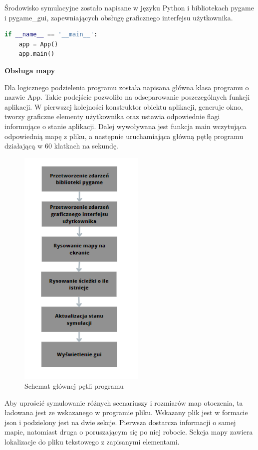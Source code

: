 Środowisko symulacyjne zostało napisane w języku Python i bibliotekach pygame\cite{dokPygame} i pygame\_gui\cite{dokPygameGui},
zapewniających obsługę graficznego interfejsu użytkownika. 
\begin{lstlisting}[language=Python,caption=Uruchomienie aplikacji,label={kodPythonStartApki}]
if __name__ == '__main__':
    app = App()
    app.main()
\end{lstlisting}

\textbf{Obsługa mapy}

Dla logicznego podzielenia programu została napisana główna klasa programu o nazwie App.
Takie podejście pozwoliło na odseparowanie poszczególnych funkcji aplikacji. 
W pierwszej kolejności konstruktor obiektu aplikacji, generuje okno, tworzy 
graficzne elementy użytkownika oraz ustawia odpowiednie flagi informujące o stanie aplikacji. 
Dalej wywoływana jest funkcja main wczytująca odpowiednią mapę z pliku, a następnie uruchamiająca 
główną pętlę programu działającą w 60 klatkach na sekundę.

\begin{figure}[H]
	\centering
	\includegraphics[width=6cm]{pages/implementacja/zdjecia/schematPetliApki.png}
	\caption{Schemat głównej pętli programu}
	\label{fig:schematPetliGlownej}
\end{figure}

Aby uprościć symulowanie różnych scenariuszy i rozmiarów map otoczenia, ta ładowana jest ze wskazanego w 
programie pliku. Wskazany plik jest w formacie json i podzielony jest na dwie sekcje. 
Pierwsza dostarcza informacji o samej mapie, natomiast druga o poruszającym się po niej robocie. 
Sekcja mapy zawiera lokalizacje do pliku tekstowego z zapisanymi elementami. 

